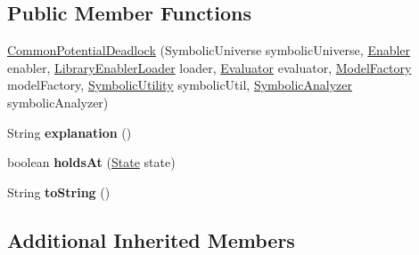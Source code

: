 \subsection*{Public Member Functions}
\begin{DoxyCompactItemize}
\item 
\hyperlink{classedu_1_1udel_1_1cis_1_1vsl_1_1civl_1_1predicate_1_1common_1_1CommonPotentialDeadlock_a9e900e2354f3335d079a14612c623685}{Common\+Potential\+Deadlock} (Symbolic\+Universe symbolic\+Universe, \hyperlink{interfaceedu_1_1udel_1_1cis_1_1vsl_1_1civl_1_1kripke_1_1IF_1_1Enabler}{Enabler} enabler, \hyperlink{interfaceedu_1_1udel_1_1cis_1_1vsl_1_1civl_1_1kripke_1_1IF_1_1LibraryEnablerLoader}{Library\+Enabler\+Loader} loader, \hyperlink{interfaceedu_1_1udel_1_1cis_1_1vsl_1_1civl_1_1semantics_1_1IF_1_1Evaluator}{Evaluator} evaluator, \hyperlink{interfaceedu_1_1udel_1_1cis_1_1vsl_1_1civl_1_1model_1_1IF_1_1ModelFactory}{Model\+Factory} model\+Factory, \hyperlink{interfaceedu_1_1udel_1_1cis_1_1vsl_1_1civl_1_1dynamic_1_1IF_1_1SymbolicUtility}{Symbolic\+Utility} symbolic\+Util, \hyperlink{interfaceedu_1_1udel_1_1cis_1_1vsl_1_1civl_1_1semantics_1_1IF_1_1SymbolicAnalyzer}{Symbolic\+Analyzer} symbolic\+Analyzer)
\item 
\hypertarget{classedu_1_1udel_1_1cis_1_1vsl_1_1civl_1_1predicate_1_1common_1_1CommonPotentialDeadlock_aabe372763c8fff8ba75c5bda5042ff1f}{}String {\bfseries explanation} ()\label{classedu_1_1udel_1_1cis_1_1vsl_1_1civl_1_1predicate_1_1common_1_1CommonPotentialDeadlock_aabe372763c8fff8ba75c5bda5042ff1f}

\item 
\hypertarget{classedu_1_1udel_1_1cis_1_1vsl_1_1civl_1_1predicate_1_1common_1_1CommonPotentialDeadlock_a83e186cf5937bd5ef9ad8420904d1de1}{}boolean {\bfseries holds\+At} (\hyperlink{interfaceedu_1_1udel_1_1cis_1_1vsl_1_1civl_1_1state_1_1IF_1_1State}{State} state)\label{classedu_1_1udel_1_1cis_1_1vsl_1_1civl_1_1predicate_1_1common_1_1CommonPotentialDeadlock_a83e186cf5937bd5ef9ad8420904d1de1}

\item 
\hypertarget{classedu_1_1udel_1_1cis_1_1vsl_1_1civl_1_1predicate_1_1common_1_1CommonPotentialDeadlock_aafd0fe99826c492af980e3cd0bb7210d}{}String {\bfseries to\+String} ()\label{classedu_1_1udel_1_1cis_1_1vsl_1_1civl_1_1predicate_1_1common_1_1CommonPotentialDeadlock_aafd0fe99826c492af980e3cd0bb7210d}

\end{DoxyCompactItemize}
\subsection*{Additional Inherited Members}


